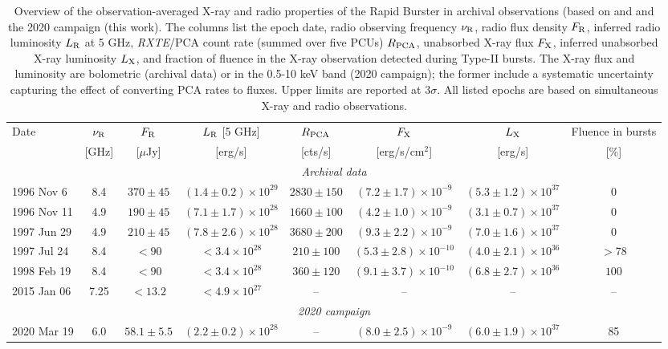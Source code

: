 \documentclass[fleqn,usenatbib]{mnras}
\begin{document}
\begin{table}
  \begin{centering}
  \begin{tabular}{lccccccc}
   \hline
Date & $\nu_{\rm R}$ & $F_{\rm R}$ & $L_{\rm R}$ [5 GHz] & $R_{\rm PCA}$ & $F_{\rm X}$ & $L_{\rm X}$ & Fluence in bursts \\
& [GHz] & [$\mu$Jy] & [erg/s] & [cts/s] & [erg/s/cm$^2$] & [erg/s] & [\%] \\
    \hline
\multicolumn{8}{c}{\textit{Archival data}}     \vspace{1mm}\\
1996 Nov 6 & 8.4 & $370\pm45$ & $(1.4\pm0.2)\times10^{29}$ & $2830 \pm 150$ & $(7.2\pm1.7)\times10^{-9}$ & $(5.3\pm1.2)\times10^{37}$
 & $0$ \\ 
1996 Nov 11 & 4.9 & $190\pm45$ & $(7.1\pm1.7)\times10^{28}$ & $1660 \pm 100$ & $(4.2\pm1.0)\times10^{-9}$ & $(3.1\pm0.7)\times10^{37}$ & $0$ \\ 
1997 Jun 29 & 4.9 & $210\pm45$ & $(7.8\pm2.6)\times10^{28}$ & $3680 \pm 200$ & $(9.3\pm2.2)\times10^{-9}$ & $(7.0\pm1.6)\times10^{37}$ & $0$ \\ 
1997 Jul 24 & 8.4 & $<90$ & $<3.4\times10^{28}$ & $210 \pm 100$& $(5.3\pm2.8)\times10^{-10}$ & $(4.0\pm2.1)\times10^{36}$ & $>78$ \\ 
1998 Feb 19 & 8.4 & $<90$ & $<3.4\times10^{28}$ & $360 \pm 120$ & $(9.1\pm3.7)\times10^{-10}$ & $(6.8\pm2.7)\times10^{36}$ & $100$ \\ 
2015 Jan 06 & 7.25 & $<13.2$ & $<4.9\times10^{27}$ & -- & -- & -- & -- \\
\hline
\multicolumn{8}{c}{\textit{2020 campaign}}\vspace{1mm}\\
2020 Mar 19 & 6.0 & $58.1 \pm 5.5$ & $(2.2 \pm 0.2)\times10^{28}$ & -- & $(8.0\pm2.5)\times10^{-9}$ & $(6.0 \pm 1.9)\times10^{37}$ & 85 \\ 
\hline
  \end{tabular}
  \caption{Overview of the observation-averaged X-ray and radio properties of the Rapid Burster in archival observations (based on \citet{moore2000} and \citet{tudor2022} and the 2020 campaign (this work). The columns list the epoch date, radio observing frequency $\nu_{\rm R}$, radio flux density $F_{\rm R}$, inferred radio luminosity $L_{\rm R}$  at 5 GHz, \textit{RXTE}/PCA count rate (summed over five PCUs) $R_{\rm PCA}$, unabsorbed X-ray flux $F_{\rm X}$, inferred unabsorbed X-ray luminosity $L_{\rm X}$, and fraction of fluence in the X-ray observation detected during Type-II bursts. The X-ray flux and luminosity are bolometric (archival data) or in the 0.5-10 keV band (2020 campaign); the former include a systematic uncertainty capturing the effect of converting PCA rates to fluxes. Upper limits are reported at $3\sigma$. All listed epochs are based on simultaneous X-ray and radio observations.}
  \label{tab:archival}
  \end{centering}
\end{table}
\end{document}
